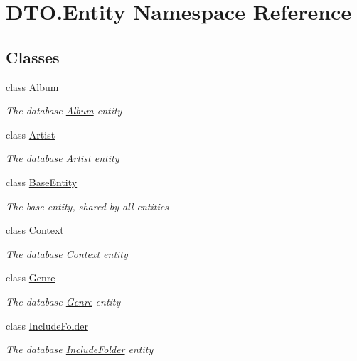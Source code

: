 \hypertarget{namespace_d_t_o_1_1_entity}{}\section{D\+T\+O.\+Entity Namespace Reference}
\label{namespace_d_t_o_1_1_entity}
\subsection*{Classes}
\begin{DoxyCompactItemize}
\item 
class \hyperlink{class_d_t_o_1_1_entity_1_1_album}{Album}
\begin{DoxyCompactList}\small\item\em The database \hyperlink{class_d_t_o_1_1_entity_1_1_album}{Album} entity \end{DoxyCompactList}\item 
class \hyperlink{class_d_t_o_1_1_entity_1_1_artist}{Artist}
\begin{DoxyCompactList}\small\item\em The database \hyperlink{class_d_t_o_1_1_entity_1_1_artist}{Artist} entity \end{DoxyCompactList}\item 
class \hyperlink{class_d_t_o_1_1_entity_1_1_base_entity}{Base\+Entity}
\begin{DoxyCompactList}\small\item\em The base entity, shared by all entities \end{DoxyCompactList}\item 
class \hyperlink{class_d_t_o_1_1_entity_1_1_context}{Context}
\begin{DoxyCompactList}\small\item\em The database \hyperlink{class_d_t_o_1_1_entity_1_1_context}{Context} entity \end{DoxyCompactList}\item 
class \hyperlink{class_d_t_o_1_1_entity_1_1_genre}{Genre}
\begin{DoxyCompactList}\small\item\em The database \hyperlink{class_d_t_o_1_1_entity_1_1_genre}{Genre} entity \end{DoxyCompactList}\item 
class \hyperlink{class_d_t_o_1_1_entity_1_1_include_folder}{Include\+Folder}
\begin{DoxyCompactList}\small\item\em The database \hyperlink{class_d_t_o_1_1_entity_1_1_include_folder}{Include\+Folder} entity \end{DoxyCompactList}\item 

\end{DoxyCompactItemize}
